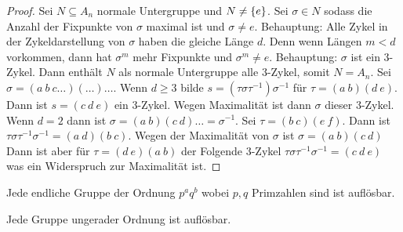 \begin{proof}
    Sei $N\subseteq A_n$ normale Untergruppe und $N\neq\{e\}$.
    Sei $\sigma\in N$ sodass die Anzahl der Fixpunkte von $\sigma$ maximal ist und $\sigma\neq e$.
    Behauptung: Alle Zykel in der Zykeldarstellung von $\sigma$ haben die gleiche Länge $d$. Denn wenn Längen $m<d$ vorkommen, dann hat $\sigma^m$ mehr Fixpunkte und $\sigma^m\neq e$.
    Behauptung: $\sigma$ ist ein 3-Zykel. Dann enthält $N$ als normale Untergruppe alle $3$-Zykel, somit $N=A_n$.
    Sei $\sigma=(a\ b \ c\dots)(\dots)\dots$. 
    Wenn $d\geq 3$ bilde $s=(\tau \sigma\tau^{-1})\sigma^{-1}$ für $\tau=(a\ b)(d\ e)$. Dann ist $s=(c\ d\ e)$ ein 3-Zykel. Wegen Maximalität ist dann $\sigma$ dieser 3-Zykel.
    Wenn $d=2$ dann ist $\sigma=(a\ b)(c \ d)\dots=\sigma^{-1}$.
    Sei $\tau=(b\ c)(e\ f)$. Dann ist $\tau\sigma\tau^{-1}\sigma^{-1}=(a\ d)(b\ c)$. Wegen der Maximalität von $\sigma$ ist $\sigma=(a\ b)(c\ d)$
    Dann ist aber für $\tau=(d\ e)(a\ b)$ der Folgende 3-Zykel $\tau\sigma\tau^{-1}\sigma^{-1}=(c\ d\ e)$ was ein Widerspruch zur Maximalität ist.
\end{proof}
\begin{Satz}[Burnside 1911]
    Jede endliche Gruppe der Ordnung $p^aq^b$ wobei $p,q$ Primzahlen sind ist auflösbar.
\end{Satz}
\begin{Satz}
    Jede Gruppe ungerader Ordnung ist auflösbar.
\end{Satz}